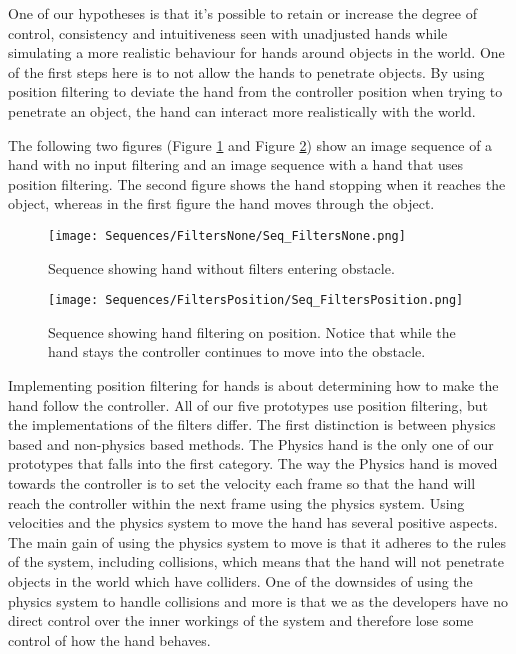 One of our hypotheses is that it's possible to retain or increase the degree of control, consistency and intuitiveness seen with unadjusted hands while simulating a more realistic behaviour for hands around objects in the world. One of the first steps here is to not allow the hands to penetrate objects. By using position filtering to deviate the hand from the controller position when trying to penetrate an object, the hand can interact more realistically with the world.

The following two figures (Figure \ref{fig:filtersNone} and Figure \ref{fig:filtersPosition}) show an image sequence of a hand with no input filtering and an image sequence with a hand that uses position filtering. The second figure shows the hand stopping when it reaches the object, whereas in the first figure the hand moves through the object.

\begin{figure}[H]
\centering
\texttt{[image: Sequences/FiltersNone/Seq\_FiltersNone.png]}
\caption{Sequence showing hand without filters entering obstacle.}
\label{fig:filtersNone}
\end{figure}

\begin{figure}[H]
\centering
\texttt{[image: Sequences/FiltersPosition/Seq\_FiltersPosition.png]}
\caption{Sequence showing hand filtering on position. Notice that while the hand stays the controller continues to move into the obstacle.}
\label{fig:filtersPosition}
\end{figure}

Implementing position filtering for hands is about determining how to make the hand follow the controller. All of our five prototypes use position filtering, but the implementations of the filters differ. The first distinction is between physics based and non-physics based methods. The Physics hand is the only one of our prototypes that falls into the first category. The way the Physics hand is moved towards the controller is to set the velocity each frame so that the hand will reach the controller within the next frame using the physics system. Using velocities and the physics system to move the hand has several positive aspects. The main gain of using the physics system to move is that it adheres to the rules of the system, including collisions, which means that the hand will not penetrate objects in the world which have colliders. One of the downsides of using the physics system to handle collisions and more is that we as the developers have no direct control over the inner workings of the system and therefore lose some control of how the hand behaves.

